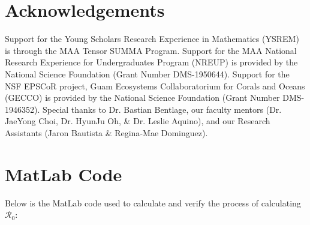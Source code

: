 \documentclass[12pt]{article}
\begin{document}
\section{Acknowledgements}
Support for the Young Scholars Research Experience in Mathematics (YSREM)  is through the MAA Tensor SUMMA Program. Support for the MAA National Research Experience for Undergraduates Program (NREUP) is provided by the National Science Foundation (Grant Number DMS-1950644). Support for the NSF EPSCoR project, Guam Ecosystems Collaboratorium for Corals and Oceans (GECCO) is provided by the National Science Foundation (Grant Number DMS-1946352).
Special thanks to Dr. Bastian Bentlage, our faculty mentors (Dr. JaeYong Choi, Dr. HyunJu Oh, \& Dr. Leslie Aquino), and our Research Assistants (Jaron Bautista \& Regina-Mae Dominguez).

\newpage
\appendix
    \section{MatLab Code}
        \label{appendix:A}
        Below is the MatLab code used to calculate and verify the process of calculating $\mathscr{R}_{0}$:
        \begin{center}
            
        \end{center}
        
\newpage
% 
% 
\printbibliography
\end{document}
